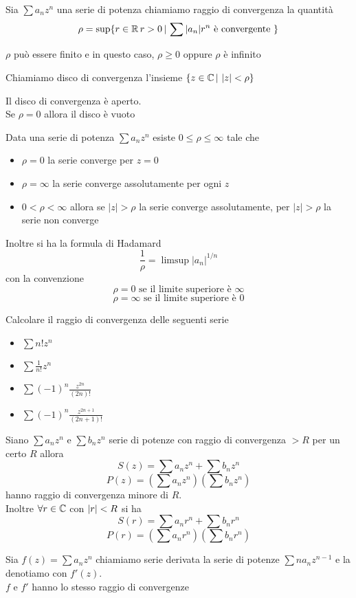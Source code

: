 \begin{defn}\bianco 
Sia $\sum a_n z^n$ una serie di potenza chiamiamo raggio di convergenza la quantit\`a 
$$\rho = \sup \{ r\in \mathbb{R} \, r>0 \, \vert \, \sum \vert a_n \vert r^n  \text{ \`e convergente } \}$$
\end{defn}
\begin{oss} $\rho$ pu\`o essere finito e in questo caso, $\rho\geq 0 $ oppure $\rho$ \`e infinito
\end{oss}
\begin{defn}Chiamiamo disco di convergenza l'insieme $\{ z \in \mathbb{C} \, \vert \,  \, \vert z\vert < \rho\}$
\end{defn}
\begin{oss}Il disco di convergenza \`e aperto.\\
Se $\rho=0$ allora il disco \`e vuoto 
\end{oss}
\begin{prop}Data una serie di potenza $\sum a_n z^n$ esiste $0\leq \rho \leq  \infty$ tale che 
\begin{itemize}
\item $\rho=0$ la serie converge per $z=0$
\item $\rho=\infty$  la serie converge assolutamente per ogni $z$
\item $0<\rho<\infty$ allora se $\vert z\vert > \rho $ la serie converge assolutamente, per $\vert z \vert > \rho $ la serie non converge
\end{itemize}
Inoltre si ha la formula di  Hadamard
$$\frac{1}{\rho}=\limsup \vert a_n \vert^{1/n}$$ 
con la convenzione 
$$\rho = 0 \text{ se  il limite superiore \`e } \infty$$
$$\rho = \infty \text{ se  il limite superiore \`e } 0$$
\end{prop}
\begin{ex}Calcolare il raggio di convergenza delle seguenti serie
\begin{itemize}
\item $\sum n! z^n$
\item $\sum \frac{1}{n!}z^n$
\item $\sum (-1)^n \frac{z^{2n}}{(2n)!}$
\item $\sum (-1)^n \frac{z^{2n+1}}{(2n+1)!}$
\end{itemize}
\end{ex}
\begin{fatto}Siano $\sum a_n z^n$ e $\sum b_n z^n $ serie di potenze con raggio di convergenza $>R$ per un certo $R$ allora
$$S(z)=\sum a_n z^n + \sum b_n z^n$$
$$P(z)=\left(\sum a_n z^n \right) \left( \sum b_n z^n\right)$$
hanno raggio di convergenza minore di $R$.\\
Inoltre $\forall r \in \mathbb{C} $ con $\left\vert r \right\vert < R$ si ha
$$ S(r) =\sum a_n r^n + \sum b_n r^n$$
$$P(r)=\left(\sum a_n r^n \right) \left( \sum b_n r^n\right)$$
\end{fatto}
\begin{fatto}
Sia $f(z)=\sum a_n z^n$ chiamiamo serie derivata la serie di potenze $\sum n a_n z^{n-1}$ e la denotiamo con $f'(z)$.\\
$f$ e $f'$ hanno lo stesso raggio di convergenze
\end{fatto}
\newpage
